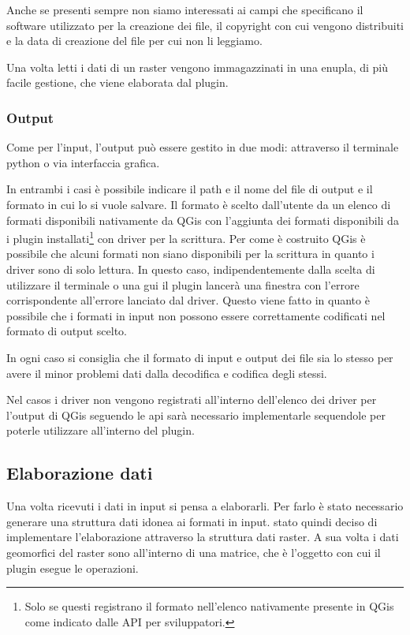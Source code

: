 Anche se presenti sempre non siamo interessati ai campi che specificano il software utilizzato per la creazione dei file, il copyright con cui vengono distribuiti e la data di creazione del file per cui non li leggiamo.

Una volta letti i dati di un raster vengono immagazzinati in una enupla, di più facile gestione, che viene elaborata dal plugin.

\subsubsection{Output}
Come per l'input, l'output può essere gestito in due modi: attraverso il terminale python o via interfaccia grafica.

In entrambi i casi è possibile indicare il path e il nome del file di output e il formato in cui lo si vuole salvare.
Il formato è scelto dall'utente da un elenco di formati disponibili nativamente da QGis con l'aggiunta dei formati disponibili da i plugin installati\footnote{Solo se questi registrano il formato nell'elenco nativamente presente in QGis come indicato dalle API per sviluppatori.} con driver per la scrittura. Per come è costruito QGis è possibile che alcuni formati non siano disponibili per la scrittura in quanto i driver sono di solo lettura. In questo caso, indipendentemente dalla scelta di utilizzare il terminale o una gui il plugin lancerà una finestra con l'errore corrispondente all'errore lanciato dal driver. Questo viene fatto in quanto è possibile che i formati in input non possono essere correttamente codificati nel formato di output scelto.

In ogni caso si consiglia che il formato di input e output dei file sia lo stesso per avere il minor problemi dati dalla decodifica e codifica degli stessi.

Nel casos i driver non vengono registrati all'interno dell'elenco dei driver per l'output di QGis seguendo le api sarà necessario implementarle sequendole per poterle utilizzare all'interno del plugin.

\subsection{Elaborazione dati}
Una volta ricevuti i dati in input si pensa a elaborarli. Per farlo è stato necessario generare una struttura dati idonea ai formati in input. \egrave stato quindi deciso di implementare l'elaborazione attraverso la struttura dati raster. A sua volta i dati geomorfici del raster sono all'interno di una matrice, che è l'oggetto con cui il plugin esegue le operazioni.

